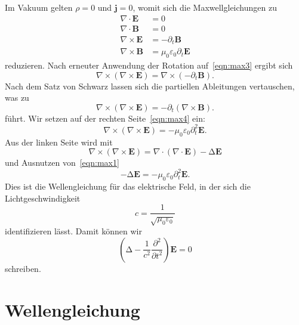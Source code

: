 \documentclass{scrartcl}
\begin{document}
Im Vakuum gelten $\rho = 0$ und $\symbf{j} = 0$, womit sich die Maxwellgleichungen zu
\begin{align}
  \nabla \cdot  \symbf{E} &= 0 \label{eqn:max1} \\
  \nabla \cdot  \symbf{B} &= 0 \label{eqn:max2} \\
  \nabla \times \symbf{E} &= - \partial_t \symbf{B} \label{eqn:max3} \\
  \nabla \times \symbf{B} &= \mu_0 \varepsilon_0 \partial_t \symbf{E} \label{eqn:max4}
\end{align}
reduzieren.
Nach erneuter Anwendung der Rotation auf~\eqref{eqn:max3} ergibt sich
\begin{equation}
  \nabla \times \left( \nabla \times \symbf{E} \right) = \nabla \times \left( - \partial_t \symbf{B} \right) .
\end{equation}
Nach dem Satz von Schwarz lassen sich die partiellen Ableitungen vertauschen, was zu
\begin{equation}
  \nabla \times \left( \nabla \times \symbf{E} \right) = - \partial_t \! \left( \nabla \times \symbf{B} \right) .
\end{equation}
führt.
Wir setzen auf der rechten Seite~\eqref{eqn:max4} ein:
\begin{equation}
  \nabla \times \left( \nabla \times \symbf{E} \right) = - \mu_0 \varepsilon_0 \partial_t^2 \symbf{E} .
\end{equation}
Aus der linken Seite wird mit
\begin{equation}
  \nabla \times \left( \nabla \times \symbf{E} \right) = \nabla \cdot \left( \nabla \cdot \symbf{E} \right) - \increment \symbf{E}
\end{equation}
und Ausnutzen von~\eqref{eqn:max1}
\begin{equation}
  - \increment\symbf{E} = -\mu_0 \varepsilon_0 \partial_t^2 \symbf{E} .
\end{equation}
Dies ist die Wellengleichung für das elektrische Feld, in der sich die Lichtgeschwindigkeit
\begin{equation}
  c = \frac{1}{\sqrt{\mu_0 \varepsilon_0}}
\end{equation}
identifizieren lässt.
Damit können wir
\begin{equation}
  \left(\increment - \frac{1}{c^2} \frac{\partial^2}{\partial t^2} \right) \! \symbf{E} = 0
\end{equation}
schreiben.

\section{Wellengleichung}
\end{document}
